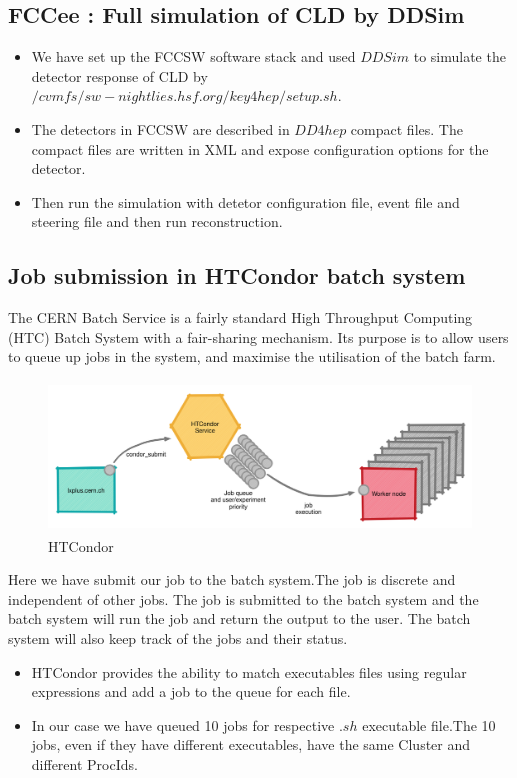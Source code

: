 \subsection{FCCee : Full simulation of CLD by DDSim}

\begin{itemize}
  \item We have set up the FCCSW software stack and used $DDSim$ to simulate the detector response of CLD by $/cvmfs/sw-nightlies.hsf.org/key4hep/setup.sh$.
  
  \item  The detectors in FCCSW are described in $DD4hep$ compact files. The compact files are written in XML and expose configuration options for the detector.
  
  \item Then run the simulation with detetor configuration file, event file and steering file and then run reconstruction. 
\end{itemize}

\subsection{Job submission in HTCondor batch system}
The CERN Batch Service is a fairly standard High Throughput Computing (HTC) Batch System with a fair-sharing mechanism.
Its purpose is to allow users to queue up jobs in the system, and maximise the utilisation of the batch farm.
\begin{figure}[h]
  \centering
  \includegraphics[width = 12cm, height = 4cm]{fcc_det/ex1.png}
  \caption{HTCondor}
  \label{fig:my_cond}
\end{figure}

Here we have submit our job to the batch system.The job is 
discrete and independent of other jobs. The job is submitted to 
the batch system and the batch system will run the job and 
return the output to the user. The batch system will also keep 
track of the jobs and their status.
\begin{itemize}
  \item HTCondor provides the ability to match executables files using regular expressions and add a job to the queue for each file. 
  \item In our case we have queued 10 jobs for respective $.sh$ executable file.The 10 jobs, even if they have different executables, have the same Cluster and different ProcIds.
\end{itemize}


